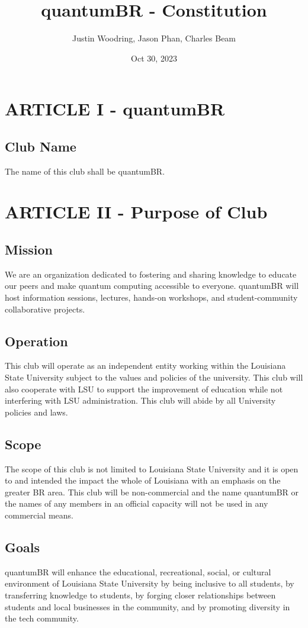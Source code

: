 \documentclass[11pt]{amsart}
\title{quantumBR - Constitution}
\author{Justin Woodring, Jason Phan, Charles Beam}
\date{Oct 30, 2023}                                           %
\begin{document}
\maketitle

\section{ARTICLE I - quantumBR} 
\subsection{Club Name}
The name of this club shall be quantumBR.

\section{ARTICLE II - Purpose of Club}
\subsection{Mission}
We are an organization dedicated to fostering and sharing knowledge to educate our peers and make quantum computing accessible to everyone. quantumBR will host information sessions, lectures, hands-on workshops, and student-community collaborative projects.
\subsection{Operation}
This club will operate as an independent entity working within the Louisiana State University subject to the values and policies of the university. This club will also cooperate with LSU to support the improvement of education while not interfering with LSU administration. This club will abide by all University policies and laws.
\subsection{Scope}
The scope of this club is not limited to Louisiana State University and it is open to and intended the impact the whole of Louisiana with an emphasis on the greater BR area. This club will be non-commercial and the name quantumBR or the names of any members in an official capacity will not be used in any commercial means.
\subsection{Goals}
quantumBR will enhance the educational, recreational, social, or cultural environment of Louisiana State University by being inclusive to all students, by transferring knowledge to students, by forging closer relationships between students and local businesses in the community, and by promoting diversity in the tech community.
\end{document}
